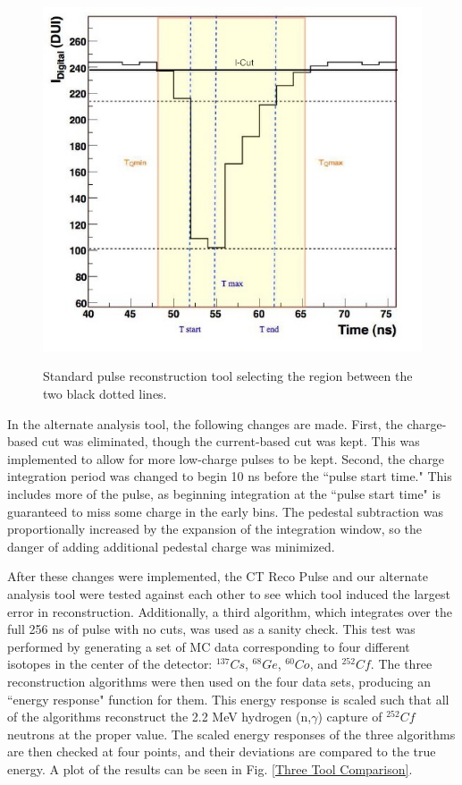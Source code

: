 \begin{figure}
\caption{Standard pulse reconstruction tool selecting the region between the two black dotted lines.}
\includegraphics[width=\textwidth]{DC_Results/Standard_Reco_Pulse.jpg}
\label{Standard Reco Pulse}
\end{figure}


In the alternate analysis tool, the following changes are made. First, the charge-based cut was eliminated, though the current-based cut was kept. This was implemented to allow for more low-charge pulses to be kept. Second, the charge integration period was changed to begin 10 ns before the ``pulse start time." This includes more of the pulse, as beginning integration at the ``pulse start time" is guaranteed to miss some charge in the early bins. The pedestal subtraction was proportionally increased by the expansion of the integration window, so the danger of adding additional pedestal charge was minimized. 

After these changes were implemented, the CT Reco Pulse and our alternate analysis tool were tested against each other to see which tool induced the largest error in reconstruction. Additionally, a third algorithm, which integrates over the full 256 ns of pulse with no cuts, was used as a sanity check. This test was performed by generating a set of MC data corresponding to four different isotopes in the center of the detector: $^{137}Cs$, $^{68}Ge$, $^{60}Co$, and $^{252}Cf$. The three reconstruction algorithms were then used on the four data sets, producing an ``energy response" function for them. This energy response is scaled such that all of the algorithms reconstruct the 2.2 MeV hydrogen (n,$\gamma$) capture of $^{252}Cf$ neutrons at the proper value. The scaled energy responses of the three algorithms are then checked at four points, and their deviations are compared to the true energy. A plot of the results can be seen in Fig. \ref{Three Tool Comparison}. 

